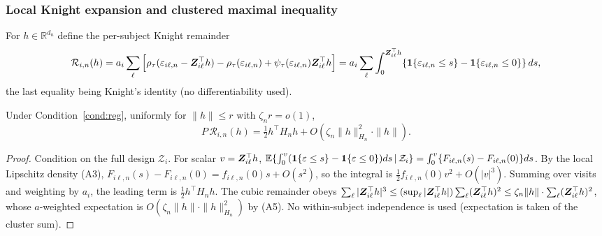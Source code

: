 \subsubsection{Local Knight expansion and clustered maximal inequality}
For $h\in\mathbb R^{d_n}$ define the per-subject Knight remainder
\[
\mathcal R_{i,n}(h)=a_i\sum_\ell\Big[\rho_\tau(\varepsilon_{i\ell,n}
-\bm{Z}_{i\ell}^\top h)-\rho_\tau(\varepsilon_{i\ell,n})
+\psi_\tau(\varepsilon_{i\ell,n})\bm{Z}_{i\ell}^\top h\Big]
=a_i\sum_\ell\int_0^{\bm{Z}_{i\ell}^\top h}\{\mathbf{1}\{\varepsilon_{i\ell,n}\le s\}
-\mathbf{1}\{\varepsilon_{i\ell,n}\le0\}\}\,ds,
\]
the last equality being Knight's identity (no differentiability used).

\begin{lemma}\label{lem:popquad}
Under Condition~\ref{cond:reg}, uniformly for $\|h\|\le r$ with $\zeta_n r=o(1)$,
\[
P\,\mathcal R_{i,n}(h)=\tfrac12 h^\top H_n h+O(\zeta_n\|h\|_{H_n}^2\cdot\|h\|).
\]
\end{lemma}
\begin{proof}
Condition on the full design $\mathcal Z_i$. For scalar $v=\bm{Z}_{i\ell}^\top h$,
$\mathbb{E}\{\int_0^v(\mathbf{1}\{\varepsilon\le s\}-\mathbf{1}\{\varepsilon\le0\})ds\,\vert\,\mathcal Z_i\}
=\int_0^v\{F_{i\ell,n}(s)-F_{i\ell,n}(0)\}ds$. By the local Lipschitz density
(A3), $F_{i\ell,n}(s)-F_{i\ell,n}(0)=f_{i\ell,n}(0)s+O(s^2)$, so the integral is
$\tfrac12 f_{i\ell,n}(0)v^2+O(|v|^3)$. Summing over visits and weighting by
$a_i$, the leading term is $\tfrac12 h^\top H_n h$. The cubic remainder obeys
$\sum_\ell|\bm{Z}_{i\ell}^\top h|^3\le(\sup_\ell|\bm{Z}_{i\ell}^\top h|)\sum_\ell
(\bm{Z}_{i\ell}^\top h)^2\le\zeta_n\|h\|\cdot\sum_\ell(\bm{Z}_{i\ell}^\top h)^2$, whose
$a$-weighted expectation is $O(\zeta_n\|h\|\cdot\|h\|_{H_n}^2)$ by (A5). No
within-subject independence is used (expectation is taken of the cluster sum).
\end{proof}

